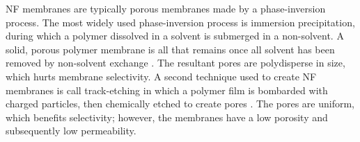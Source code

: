 \documentclass{article}
\begin{document}
 
  NF membranes are typically porous membranes made by a phase-inversion
  process.  The most widely used phase-inversion process is immersion
  precipitation, during which a polymer dissolved in a solvent is submerged in a
  non-solvent. A solid, porous polymer membrane is all that remains once all
  solvent has been removed by non-solvent exchange
  \cite{smolders_microstructures_1992}.  The resultant pores are polydisperse in
  size, which hurts membrane selectivity. A second technique used to create NF
  membranes is call track-etching in which a polymer film is bombarded with
  charged particles, then chemically etched to create pores
  \cite{apel_track_2001}. The pores are uniform, which benefits selectivity;
  however, the membranes have a low porosity and subsequently low permeability. 
 

\end{document}
